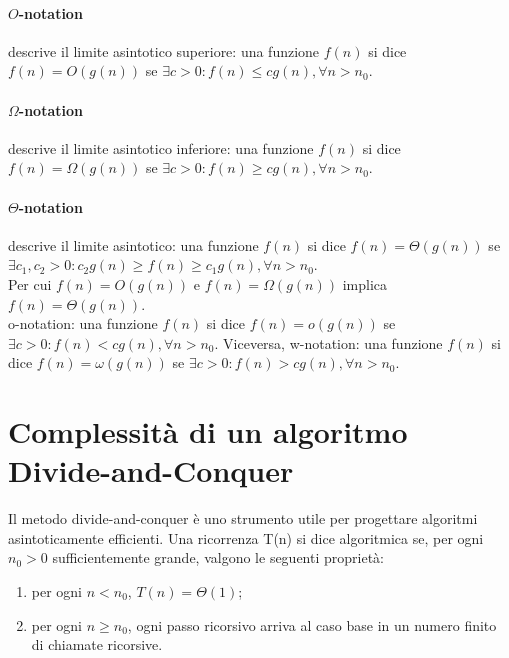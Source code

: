 \documentclass{article}
\begin{document}
\paragraph{$O$-notation} descrive il limite asintotico superiore: una funzione
$f(n)$ si dice $f(n)= O(g(n))$ se $\exists c>0:f(n) \leq cg(n), \forall n>n_0$.

\paragraph{$\Omega$-notation} descrive il limite asintotico inferiore: una funzione
$f(n)$ si dice $f(n)= \Omega(g(n))$ se $\exists c>0:f(n) \geq cg(n), \forall n>n_0$.

\paragraph{$\Theta$-notation} descrive il limite asintotico: una funzione
$f(n)$ si dice $f(n)= \Theta(g(n))$ se $\exists c_1, c_2 > 0:c_2g(n) \geq f(n)
\geq c_1g(n), \forall n>n_0$.\\

Per cui $f(n)=O(g(n))$ e $f(n)=\Omega(g(n))$ implica $f(n)=\Theta(g(n))$.\\
o-notation: una funzione $f(n)$ si dice $f(n)= o(g(n))$ se $\exists c>0: f(n) <
cg(n), \forall n>n_0$. Viceversa, w-notation: una funzione $f(n)$ si dice $f(n)
=\omega(g(n))$ se $\exists c>0: f(n) > cg(n), \forall n>n_0$.

\section{Complessità di un algoritmo Divide-and-Conquer}
Il metodo divide-and-conquer è uno strumento utile per progettare algoritmi
asintoticamente efficienti. Una ricorrenza T(n) si dice algoritmica se, per ogni
$n_0>0$ sufficientemente grande, valgono le seguenti proprietà:
\begin{enumerate}
    \item per ogni $n<n_0$, $T(n)=\Theta(1)$;
    \item per ogni $n\geq n_0$, ogni passo ricorsivo arriva al caso base in un
        numero finito di chiamate ricorsive.
\end{enumerate}
\end{document}
